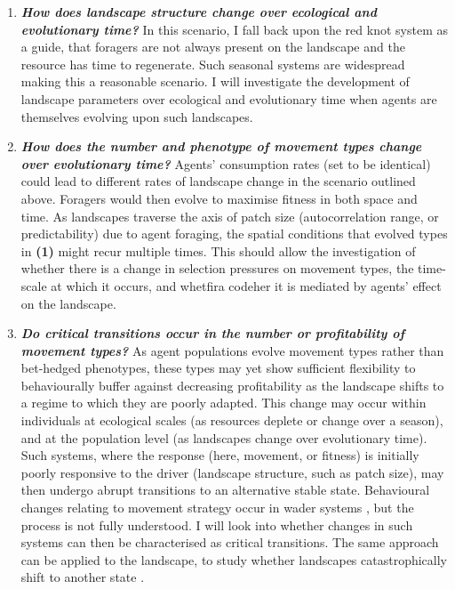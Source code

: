 \begin{enumerate}
  \begin{enumerate}
  \def\labelenumii{\alph{enumii}.}
  \item
    \textbf{\emph{How does landscape structure change over ecological and evolutionary time?}} In this scenario, I fall back upon the red knot system as a guide, that foragers are not always present on the landscape and the resource has time to regenerate. Such seasonal systems are widespread making this a reasonable scenario. I will investigate the development of landscape parameters over ecological and evolutionary time \citep[such as the autocorrelation range, or patch size; see][]{legendre1993} when agents are themselves evolving upon such landscapes.
  \item
    \textbf{\emph{How does the number and phenotype of movement types change over evolutionary time?}} Agents' consumption rates (set to be identical) could lead to different rates of landscape change in the scenario outlined above. Foragers would then evolve to maximise fitness in both space and time. As landscapes traverse the axis of patch size (autocorrelation range, or predictability) due to agent foraging, the spatial conditions that evolved types in \textbf{(1)} might recur multiple times. This should allow the investigation of whether there is a change in selection pressures on movement types, the time-scale at which it occurs, and whetfira codeher it is mediated by agents' effect on the landscape.
  \item
    \textbf{\emph{Do critical transitions occur in the number or profitability of movement types?}} As agent populations evolve movement types rather than bet-hedged phenotypes, these types may yet show sufficient flexibility to behaviourally buffer against decreasing profitability as the landscape shifts to a regime to which they are poorly adapted. This change may occur within individuals at ecological scales (as resources deplete or change over a season), and at the population level (as landscapes change over evolutionary time). Such systems, where the response (here, movement, or fitness) is initially poorly responsive to the driver (landscape structure, such as patch size), may then undergo abrupt transitions \citep{scheffer2009} to an alternative stable state. Behavioural changes relating to movement strategy occur in wader systems \citep{oudman2018}, but the process is not fully understood. I will look into whether changes in such systems can then be characterised as critical transitions. The same approach can be applied to the landscape, to study whether landscapes catastrophically shift to another state \citep[as in][]{vandekoppel1997, jefferies2006}.
  \end{enumerate}
\end{enumerate}

